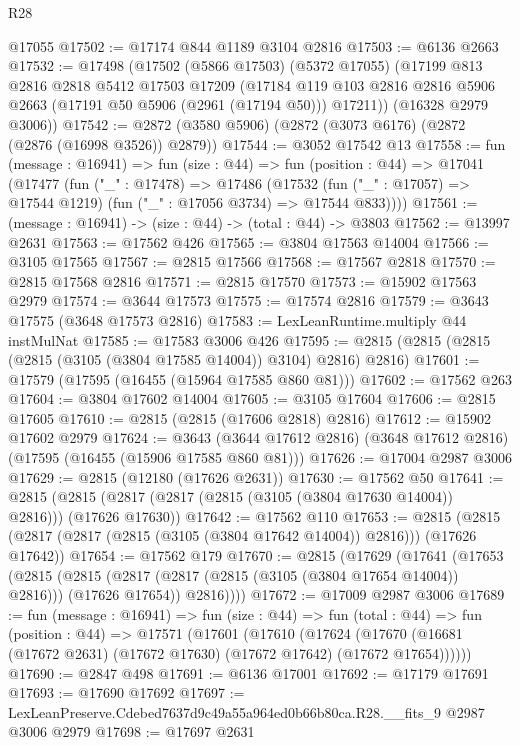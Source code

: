 \begin{lexlean}{R28}
\begin{coremodule}
    @17055
@17502 := @17174 @844 @1189 @3104 @2816
@17503 := @6136 @2663
@17532 := @17498
    (@17502
      (@5866 @17503)
      (@5372 @17055)
      (@17199
        @813
        @2816
        @2818
        @5412
        @17503
        @17209
        (@17184 @119 @103 @2816 @2816 @5906 @2663 (@17191 @50 @5906 (@2961 (@17194 @50))) @17211))
      (@16328 @2979 @3006))
@17542 := @2872 (@3580 @5906) (@2872 (@3073 @6176) (@2872 (@2876 (@16998 @3526)) @2879))
@17544 := @3052 @17542 @13
@17558 := fun (message : @16941) =>
  fun (size : @44) =>
  fun (position : @44) =>
  @17041
    (@17477
      (fun ("_" : @17478) =>
      @17486
        (@17532 (fun ("_" : @17057) => @17544 @1219) (fun ("_" : @17056 @3734) => @17544 @833))))
@17561 := (message : @16941) -> (size : @44) -> (total : @44) -> @3803
@17562 := @13997 @2631
@17563 := @17562 @426
@17565 := @3804 @17563 @14004
@17566 := @3105 @17565
@17567 := @2815 @17566
@17568 := @17567 @2818
@17570 := @2815 @17568 @2816
@17571 := @2815 @17570
@17573 := @15902 @17563 @2979
@17574 := @3644 @17573
@17575 := @17574 @2816
@17579 := @3643 @17575 (@3648 @17573 @2816)
@17583 := LexLeanRuntime.multiply @44 instMulNat
@17585 := @17583 @3006 @426
@17595 := @2815 (@2815 (@2815 (@2815 (@3105 (@3804 @17585 @14004)) @3104) @2816) @2816)
@17601 := @17579 (@17595 (@16455 (@15964 @17585 @860 @81)))
@17602 := @17562 @263
@17604 := @3804 @17602 @14004
@17605 := @3105 @17604
@17606 := @2815 @17605
@17610 := @2815 (@2815 (@17606 @2818) @2816)
@17612 := @15902 @17602 @2979
@17624 := @3643 (@3644 @17612 @2816) (@3648 @17612 @2816) (@17595 (@16455 (@15906 @17585 @860 @81)))
@17626 := @17004 @2987 @3006
@17629 := @2815 (@12180 (@17626 @2631))
@17630 := @17562 @50
@17641 := @2815 (@2815 (@2817 (@2817 (@2815 (@3105 (@3804 @17630 @14004)) @2816))) (@17626 @17630))
@17642 := @17562 @110
@17653 := @2815 (@2815 (@2817 (@2817 (@2815 (@3105 (@3804 @17642 @14004)) @2816))) (@17626 @17642))
@17654 := @17562 @179
@17670 := @2815
    (@17629
      (@17641
        (@17653
          (@2815
            (@2815 (@2817 (@2817 (@2815 (@3105 (@3804 @17654 @14004)) @2816))) (@17626 @17654))
            @2816))))
@17672 := @17009 @2987 @3006
@17689 := fun (message : @16941) =>
  fun (size : @44) =>
  fun (total : @44) =>
  fun (position : @44) =>
  @17571
    (@17601
      (@17610
        (@17624 (@17670 (@16681 (@17672 @2631) (@17672 @17630) (@17672 @17642) (@17672 @17654))))))
@17690 := @2847 @498
@17691 := @6136 @17001
@17692 := @17179 @17691
@17693 := @17690 @17692
@17697 := LexLeanPreserve.Cdebed7637d9c49a55a964ed0b66b80ca.R28.__fits_9 @2987 @3006 @2979
@17698 := @17697 @2631

\end{coremodule}
\end{lexlean}
